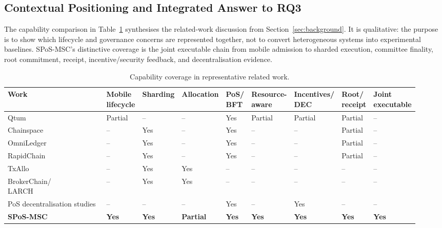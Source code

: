 \documentclass[a4paper,fleqn]{cas-sc}
\begin{document}
\FloatBarrier

\subsection{Contextual Positioning and Integrated Answer to RQ3}
\label{subsec:contextual_comparison}
\label{subsec:discussion}

The capability comparison in Table~\ref{tab:capability_compare} synthesises the
related-work discussion from Section~\ref{sec:background}. It is qualitative:
the purpose is to show which lifecycle and governance concerns are represented
together, not to convert heterogeneous systems into experimental baselines.
SPoS-MSC's distinctive coverage is the joint executable chain from mobile
admission to sharded execution, committee finality, root commitment, receipt,
incentive/security feedback, and decentralisation evidence.

\begin{table}[pos=t]
\centering
\caption{Capability coverage in representative related work.}
\label{tab:capability_compare}
\scriptsize
\setlength{\tabcolsep}{2.0pt}
\renewcommand{\arraystretch}{1.08}
\begin{tabularx}{\textwidth}{p{2.35cm}*{8}{>{\centering\arraybackslash}X}}
\toprule
\textbf{Work} & \shortstack{\textbf{Mobile}\\\textbf{lifecycle}} &
\textbf{Sharding} & \textbf{Allocation} &
\shortstack{\textbf{PoS/}\\\textbf{BFT}} &
\shortstack{\textbf{Resource-}\\\textbf{aware}} &
\shortstack{\textbf{Incentives/}\\\textbf{DEC}} &
\shortstack{\textbf{Root/}\\\textbf{receipt}} &
\shortstack{\textbf{Joint}\\\textbf{executable}}\\
\midrule
Qtum~\cite{dai2017smart} & Partial & -- & -- & Yes & Partial & Partial & Partial & --\\
Chainspace~\cite{Al-Bassam} & -- & Yes & -- & Yes & -- & -- & Partial & --\\
OmniLedger~\cite{Kokoris-Kogias2018} & -- & Yes & -- & Yes & -- & -- & Partial & --\\
RapidChain~\cite{Zamani2018a} & -- & Yes & -- & Yes & -- & -- & Partial & --\\
TxAllo~\cite{Zhang2023TxAllo} & -- & Yes & Yes & -- & -- & -- & -- & --\\
\shortstack[l]{BrokerChain/\\LARCH\\\cite{Huang2022Brokerchain,jorika2026larch}} & -- & Yes & Yes & -- & -- & -- & -- & --\\
PoS decentralisation studies~\cite{motepalli2025pos} & -- & -- & -- & Yes & -- & Yes & -- & --\\
\textbf{SPoS-MSC} & \textbf{Yes} & \textbf{Yes} & \textbf{Partial} &
\textbf{Yes} & \textbf{Yes} & \textbf{Yes} & \textbf{Yes} & \textbf{Yes}\\
\bottomrule
\end{tabularx}
\end{table}
\end{document}
